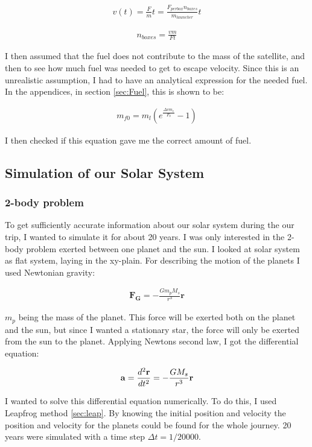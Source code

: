 \documentclass[a4paper, 10pt]{article}
\begin{document}
\begin{align}
v(t) = \frac{F}{m} t = \frac{F_{per box}n_{boxes}}{m_{launcher}} t
\end{align}

\begin{align}\label{eq:boxes}
n_{boxes} = \frac{v m}{F t}
\end{align}

I then assumed that the fuel does not contribute to the mass of the satellite, and then to see how much fuel was needed to get to escape velocity. Since this is an unrealistic assumption, I had to have an analytical expression for the needed fuel. In the appendices, in section \ref{sec:Fuel}, this is shown to be:

\begin{align}\label{eq:Fuel}
m_{f0} = m_l(e^{\frac{\Delta v m_e}{F_b}} - 1)
\end{align}

I then checked if this equation gave me the correct amount of fuel.

\subsection{Simulation of our Solar System}
\subsubsection{2-body problem}
To get sufficiently accurate information about our solar system during the our trip, I wanted to simulate it for about 20 years. I was only interested in the 2-body problem exerted between one planet and the sun. I looked at solar system as flat system, laying in the xy-plain. For describing the motion of the planets I used Newtonian gravity:

\begin{align}
\textbf{F}_\textbf{G} = -\frac{Gm_p M_s}{r^{3}}\textbf{r}
\end{align}

$m_p$ being the mass of the planet. This force will be exerted both on the planet and the sun, but since I wanted a stationary star, the force will only be exerted from the sun to the planet. Applying Newtons second law, I got the differential equation:

$$
\bold{a} = \frac{d^{2}\textbf{r}}{dt^{2}}  = -\frac{G M_s}{r^{3}}\textbf{r}
$$ 


I wanted to solve this differential equation numerically. To do this, I used Leapfrog method \ref{sec:leap}. By knowing the initial position and velocity the position and velocity for the planets could be found for the whole journey. 20 years were simulated with a time step $\Delta t = 1/20000.$\\
\end{document}
